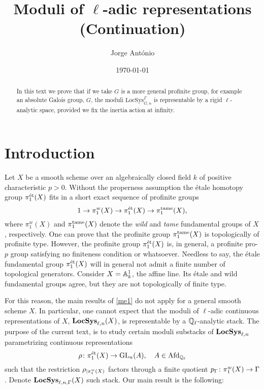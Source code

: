 \documentclass[10pt,a4paper]{amsart}
\author{Jorge Ant\'onio}
\numberwithin{equation}{subsection}
\theoremstyle{plain}
\theoremstyle{definition}
\theoremstyle{remark}
\numberwithin{equation}{section}
\begin{document}
\title{Moduli of $\ell$-adic representations (Continuation)}




\date{\today}

\maketitle

\renewcommand\labelitemi{\textbullet}








\begin{abstract}
In this text we prove that if we take $G$ is a more general profinite group, for example an absolute Galois group, $G$, the moduli $\mathrm{LocSys}_{G,n}^{ \Gamma}$ is representable by a 
rigid $\ell$-analytic space, provided we fix the inertia action at infinity.
\end{abstract}

\setcounter{tocdepth}{1}
\tableofcontents


\section{Introduction}
Let $X$ be a smooth scheme over an algebraically closed field $k$ of positive characteristic $p>0$.
Without the properness assumption
the \'etale homotopy group $\pi_1^{\text{\'et}}(X)$ fits in a short exact sequence of profinite groups
    \begin{equation} \label{ss_intro}
        1 \to \pi_1^w(X) \to \pi_1^{\text{\'et}}(X) \to \pi_1^{\mathrm{tame}}(X),
    \end{equation}
where $\pi_1^w(X)$ and $\pi_1^{\mathrm{tame}}(X)$ denote the \emph{wild} and \emph{tame} fundamental groups of $X$, respectively. One can prove that the profinite group $\pi_1^{\mathrm{tame}}(X)$ is
topologically of profinite type. However, the profinite group $\pi_1^{\text{\'et}}(X)$ is, in general, a profinite pro-$p$ group satisfying no finiteness condition or whatsoever. Needless to say,
the \'etale fundamental group $\pi_1^{\text{\'et}}(X)$ will in general not admit a finite number of topological generators.
Consider $X = \mathbb A^1_k$, the affine line. Its
\'etale and wild fundamental groups agree, but they are not topologically of finite type.

For this reason, the main results of \cref{me1} do not apply for a general smooth scheme $X$. In particular, one cannot expect that the moduli of $\ell$-adic continuous representations of
$X$, $\mathbf{LocSys}_{\ell, n}(X)$, is representable by a $\mathbb{Q}_\ell$-analytic stack. 
The purpose of the current text, is to study certain moduli substacks of $\mathbf{LocSys}_{\ell, n}$ parametrizing continuous representations
    \[
        \rho \colon \pi_1^{\text{\'et}} (X) \to \mathrm{GL}_n(A), \quad A \in \mathrm{Afd}_{\mathbb{Q}_\ell}
    \]
such that the restriction $\rho_{\vert \pi_1^w(X)}$ factors through a finite quotient $p_\Gamma \colon \pi_1^w(X) \to \Gamma$. Denote $\mathbf{LocSys}_{\ell, n, \Gamma}(X)$ such stack. Our main result is the
following:
\end{document}
